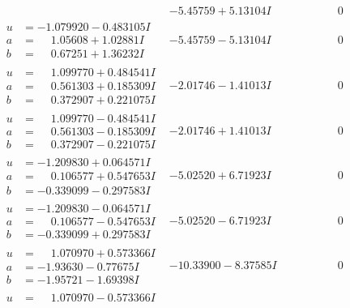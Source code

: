 \documentclass[1p]{elsarticle_modified}
\theoremstyle{definition}
\begin{document}
$$\begin{array}{c|c|c}
 & -5.45759 + 5.13104 I & \phantom{-0.000000 } 0 \\ \hline\begin{aligned}
u &= -1.079920 - 0.483105 I \\
a &= \phantom{-}1.05608 + 1.02881 I \\
b &= \phantom{-}0.67251 + 1.36232 I\end{aligned}
 & -5.45759 - 5.13104 I & \phantom{-0.000000 } 0 \\ \hline\begin{aligned}
u &= \phantom{-}1.099770 + 0.484541 I \\
a &= \phantom{-}0.561303 + 0.185309 I \\
b &= \phantom{-}0.372907 + 0.221075 I\end{aligned}
 & -2.01746 - 1.41013 I & \phantom{-0.000000 } 0 \\ \hline\begin{aligned}
u &= \phantom{-}1.099770 - 0.484541 I \\
a &= \phantom{-}0.561303 - 0.185309 I \\
b &= \phantom{-}0.372907 - 0.221075 I\end{aligned}
 & -2.01746 + 1.41013 I & \phantom{-0.000000 } 0 \\ \hline\begin{aligned}
u &= -1.209830 + 0.064571 I \\
a &= \phantom{-}0.106577 + 0.547653 I \\
b &= -0.339099 - 0.297583 I\end{aligned}
 & -5.02520 + 6.71923 I & \phantom{-0.000000 } 0 \\ \hline\begin{aligned}
u &= -1.209830 - 0.064571 I \\
a &= \phantom{-}0.106577 - 0.547653 I \\
b &= -0.339099 + 0.297583 I\end{aligned}
 & -5.02520 - 6.71923 I & \phantom{-0.000000 } 0 \\ \hline\begin{aligned}
u &= \phantom{-}1.070970 + 0.573366 I \\
a &= -1.93630 - 0.77675 I \\
b &= -1.95721 - 1.69398 I\end{aligned}
 & -10.33900 - 8.37585 I & \phantom{-0.000000 } 0 \\ \hline\begin{aligned}
u &= \phantom{-}1.070970 - 0.573366 I \\

\end{aligned}
\end{array}$$
\end{document}
